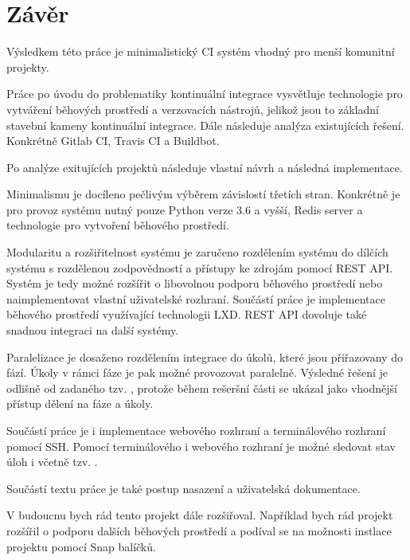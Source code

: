 \chapter{Závěr}

Výsledkem této práce je minimalistický CI systém vhodný pro menší komunitní projekty.

Práce po úvodu do problematiky kontinuální integrace vysvětluje technologie pro vytváření běhových prostředí a verzovacích nástrojů, jelikož jsou to základní stavební kameny kontinuální integrace.
Dále následuje analýza existujících řešení.
Konkrétně Gitlab CI, Travis CI a Buildbot.

Po analýze exitujících projektů následuje vlastní návrh a následná implementace.

Minimalismu je docíleno pečlivým výběrem závislostí třetích stran.
Konkrétně je pro provoz systému nutný pouze Python verze 3.6 a vyšší, Redis server a technologie pro vytvoření běhového prostředí.

Modularitu a rozšiřitelnost systému je zaručeno rozdělením systému do dílčích systému s rozdělenou zodpovědností a přístupy ke zdrojám pomocí REST API.
Systém je tedy možné rozšířit o libovolnou podporu běhového prostředí nebo naimplementovat vlastní uživatelské rozhraní.
Součástí práce je implementace běhového prostředí využívající technologii LXD.
REST API dovoluje také snadnou integraci na další systémy.

Paralelizace je dosaženo rozdělením integrace do úkolů, které jsou přiřazovany do fází.
Úkoly v rámci fáze je pak možné provozovat paralelně.
Výsledné řešení je odlišně od zadaného tzv. , protože během rešeršní části se ukázal jako vhodnější přístup dělení na fáze a úkoly.

Součástí práce je i implementace webového rozhraní a terminálového rozhraní pomocí SSH.
Pomocí terminálového i webového rozhraní je možné sledovat stav úloh i včetně tzv. .

Součástí textu práce je také postup nasazení a uživatelská dokumentace.

V budoucnu bych rád tento projekt dále rozšiřoval.
Například bych rád projekt rozšířil o podporu dalších běhových prostředí a podíval se na možnosti instlace projektu pomocí Snap balíčků.



